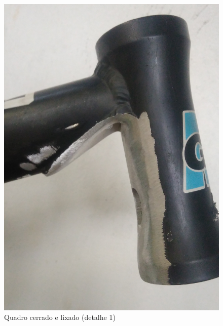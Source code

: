 	\graphicspath{{figuras/}}
	\begin{figure}[h!]
		\centering
		\includegraphics[scale=0.08]{quadro_cerrado_1.jpg}
		\caption{Quadro cerrado e lixado (detalhe 1)}
		\label{img:quadro_cerrado_1}
	\end{figure}
	
